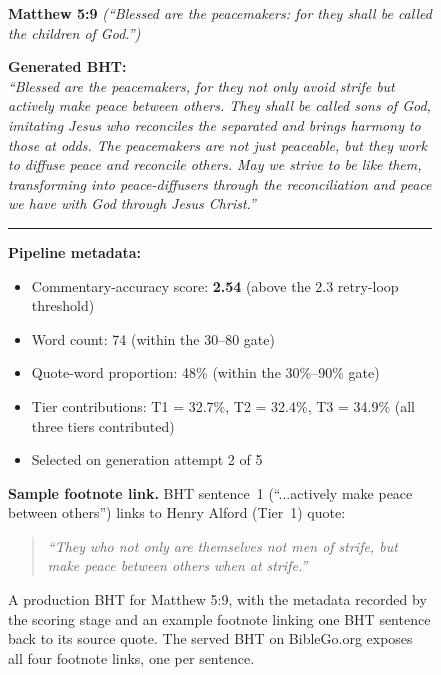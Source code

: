 \begin{figure}[t]
\centering
\begin{tcolorbox}[
    colback=pipeline!4,
    colframe=pipeline!50,
    boxrule=0.5pt,
    arc=2pt,
    left=6pt, right=6pt, top=4pt, bottom=4pt,
    fontupper=\small,
    width=0.95\columnwidth
]
\textbf{Matthew 5:9} \textit{(``Blessed are the peacemakers: for they shall be called the children of God.'')}
\vspace{0.3em}

\textbf{Generated BHT:}\\
\textit{``Blessed are the peacemakers, for they not only avoid strife but actively make peace between others. They shall be called sons of God, imitating Jesus who reconciles the separated and brings harmony to those at odds. The peacemakers are not just peaceable, but they work to diffuse peace and reconcile others. May we strive to be like them, transforming into peace-diffusers through the reconciliation and peace we have with God through Jesus Christ.''}

\vspace{0.4em}
\hrule
\vspace{0.4em}

\textbf{Pipeline metadata:}
\begin{itemize}[nosep,leftmargin=*,font=\footnotesize]
    \item Commentary-accuracy score: \textbf{2.54} (above the 2.3 retry-loop threshold)
    \item Word count: 74 (within the 30--80 gate)
    \item Quote-word proportion: 48\% (within the 30\%--90\% gate)
    \item Tier contributions: T1 = 32.7\%, T2 = 32.4\%, T3 = 34.9\% (all three tiers contributed)
    \item Selected on generation attempt 2 of 5
\end{itemize}

\vspace{0.3em}
\textbf{Sample footnote link.} BHT sentence~1 (``...actively make peace between others'') links to Henry Alford (Tier~1) quote:
\begin{quote}
\footnotesize
\textit{``They who not only are themselves not men of strife, but make peace between others when at strife.''}
\end{quote}

\end{tcolorbox}
\caption{A production BHT for Matthew 5:9, with the metadata recorded by the scoring stage and an example footnote linking one BHT sentence back to its source quote. The served BHT on BibleGo.org exposes all four footnote links, one per sentence.}
\label{fig:bhtexample}
\end{figure}

